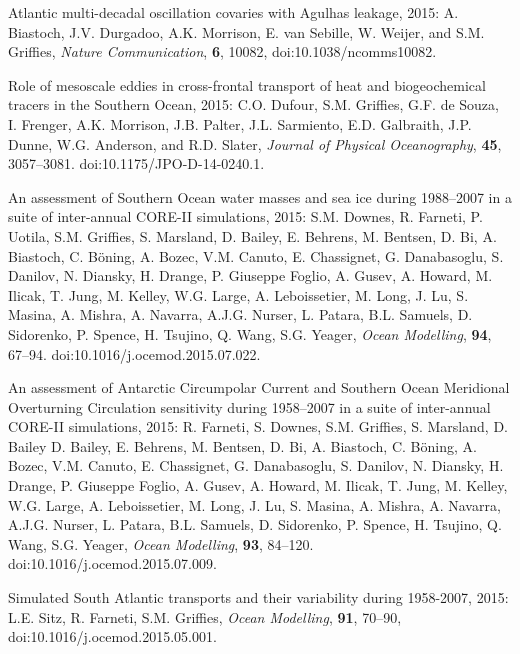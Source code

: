 \begin{etaremune}
\item Atlantic multi-decadal oscillation covaries with Agulhas leakage, 2015: A. Biastoch, J.V. Durgadoo, A.K. Morrison, E. van Sebille, W. Weijer, and S.M. Grif\/f\/ies, {\it Nature Communication}, {\bf 6}, 10082, doi:10.1038/ncomms10082.

\item Role of mesoscale eddies in cross-frontal transport of heat and biogeochemical tracers in the Southern Ocean, 2015: C.O. Dufour,
  S.M. Grif\/f\/ies, G.F. de Souza, I. Frenger, A.K. Morrison,
  J.B. Palter, J.L. Sarmiento, E.D. Galbraith, J.P. Dunne,
  W.G. Anderson, and R.D. Slater, {\it Journal of Physical
    Oceanography}, {\bf 45}, 3057--3081. 
    doi:10.1175/JPO-D-14-0240.1.

\item An assessment of Southern Ocean water masses and sea ice during
  1988--2007 in a suite of inter-annual CORE-II simulations, 2015:
  S.M. Downes, R. Farneti, P. Uotila, S.M. Grif\/f\/ies,
  S. Marsland, D. Bailey, E. Behrens, M. Bentsen, D. Bi, A. Biastoch,
  C. B\"oning, A. Bozec, V.M. Canuto, E. Chassignet, G. Danabasoglu,
  S. Danilov, N. Diansky, H. Drange, P. Giuseppe Foglio, A. Gusev,
  A. Howard, M. Ilicak, T.  Jung, M. Kelley, W.G. Large,
  A. Leboissetier, M. Long, J. Lu, S. Masina, A. Mishra, A. Navarra,
  A.J.G. Nurser, L. Patara, B.L. Samuels, D. Sidorenko, P. Spence,
  H. Tsujino, Q. Wang, S.G. Yeager, {\it Ocean Modelling}, {\bf 94},
  67--94.  doi:10.1016/j.ocemod.2015.07.022.



\item An assessment of Antarctic Circumpolar Current and Southern
  Ocean Meridional Overturning Circulation sensitivity during
  1958--2007 in a suite of inter-annual CORE-II simulations, 2015:
  R. Farneti, S. Downes, S.M. Grif\/f\/ies, S. Marsland,
  D. Bailey D. Bailey, E. Behrens, M. Bentsen, D. Bi, A. Biastoch,
  C. B\"oning, A. Bozec, V.M. Canuto, E. Chassignet, G. Danabasoglu,
  S. Danilov, N. Diansky, H. Drange, P. Giuseppe Foglio, A. Gusev,
  A. Howard, M. Ilicak, T.  Jung, M. Kelley, W.G. Large,
  A. Leboissetier, M. Long, J. Lu, S. Masina, A. Mishra, A. Navarra,
  A.J.G. Nurser, L. Patara, B.L. Samuels, D. Sidorenko, P. Spence,
  H. Tsujino, Q. Wang, S.G. Yeager, {\it Ocean Modelling}, {\bf 93},
  84--120. doi:10.1016/j.ocemod.2015.07.009.

\item Simulated South Atlantic transports and their variability during
  1958-2007, 2015: L.E.  Sitz, R. Farneti, S.M. Grif\/f\/ies,
  {\it Ocean Modelling}, {\bf 91}, 70--90,
  doi:10.1016/j.ocemod.2015.05.001.


\end{etaremune}
